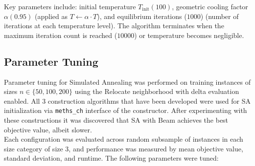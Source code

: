 \documentclass[a4paper]{scrartcl}
\begin{document}
Key parameters include: initial temperature $T_{\text{init}} (100)$, geometric cooling factor $\alpha (0.95)$ (applied as $T \leftarrow \alpha \cdot T$), and equilibrium iterations ($1000$) (number of iterations at each temperature level). The algorithm terminates when the maximum iteration count is reached ($10000$) or temperature becomes negligible.

\subsection{Parameter Tuning}
Parameter tuning for Simulated Annealing was performed on training instances of sizes $n \in \{50, 100, 200\}$ using the Relocate neighborhood with delta evaluation enabled. All 3 construction algorithms that have been developed were used for SA initialization via \texttt{meths\_ch} interface of the constructor. After experimenting with these constructions it was discovered that SA with Beam achieves the best objective value, albeit slower. 
\\Each configuration was evaluated across random subsample of instances in each size category of size 3, and performance was measured by mean objective value, standard deviation, and runtime. The following parameters were tuned:
\end{document}
